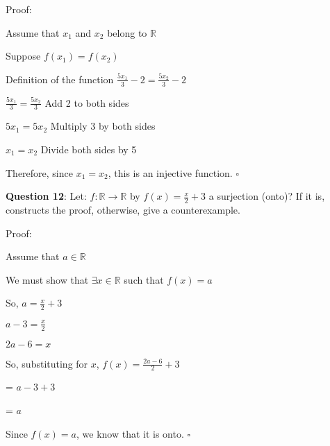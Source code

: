 \documentclass{article} %
\newcommand{\question}[2][]{\begin{flushleft}
        \textbf{Question #1}: #2
\end{flushleft}}
\begin{document}
    Proof:

    Assume that $x_1$ and $x_2$ belong to $\mathbb{R}$

    Suppose $f(x_1) = f(x_2)$

    \vspace*{0.1cm}

    Definition of the function $\frac{5x_1}{3} - 2 = \frac{5x_2}{3} - 2$

    \vspace*{0.1cm}

    \tabto*{5.15cm} $\frac{5x_1}{3} = \frac{5x_2}{3}$ \tabto*{8cm} Add 2 to both sides

    \tabto*{5.15cm} $5x_1 = 5x_2$ \tabto*{8cm} Multiply 3 by both sides

    \tabto*{5.33cm} $x_1 = x_2$ \tabto*{8cm} Divide both sides by 5

    Therefore, since $x_1 = x_2$, this is an injective function. $\square$

    \question[12]{Let: $f: \mathbb{R} \rightarrow \mathbb{R}$ by $f(x) = \frac{x}{2} + 3$ a surjection (onto)? If it is, constructs the proof, 
    otherwise, give a counterexample.}

    Proof:

    Assume that $a \in \mathbb{R}$
    
    We must show that $\exists x \in \mathbb{R}$ such that $f(x) = a$

    So, $a = \frac{x}{2} + 3$

    \tabto{1cm} $a-3 = \frac{x}{2}$

    \tabto{1cm} $2a - 6 = x$

    So, substituting for $x$, $f(x) = \frac{2a - 6}{2} + 3$

    \tabto{4.82cm} = $a - 3 + 3$

    \tabto{4.82cm} = $a$

    Since $f(x) = a$, we know that it is onto. $\square$



    
\end{document}
